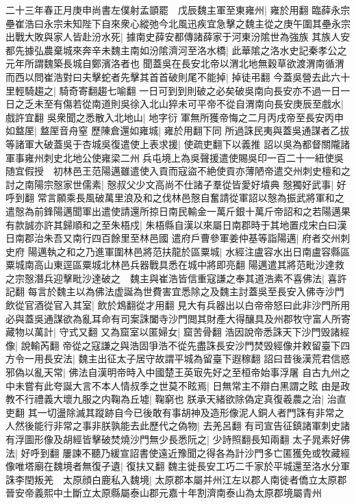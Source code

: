 二十三年春正月庚申尚書左僕射孟顗罷　戊辰魏主軍至東雍州|{
	雍於用翻}
臨薛永宗壘崔浩曰永宗未知陛下自來衆心縱弛今北風迅疾宜急擊之魏主從之庚午圍其壘永宗出戰大敗與家人皆赴汾水死|{
	據南史薛安都傳諸薛家于河東汾隂世為強族}
其族人安都先據弘農棄城來奔辛未魏主南如汾隂濟河至洛水橋|{
	此華隂之洛水史記秦孝公之元年所謂魏築長城自鄭濱洛者也}
聞蓋吳在長安北帝以渭北地無穀草欲渡渭南循渭而西以問崔浩對曰夫擊蛇者先擊其首首破則尾不能掉|{
	掉徒弔翻}
今蓋吳營去此六十里輕騎趨之|{
	騎奇寄翻趨七喻翻}
一日可到到則破之必矣破吳南向長安亦不過一日一日之乏未至有傷若從南道則吳徐入北山猝未可平帝不從自渭南向長安庚辰至戲水|{
	戲許宜翻}
吳衆聞之悉散入北地山|{
	地字衍}
軍無所獲帝悔之二月丙戌帝至長安丙申如盩厔|{
	盩厔音舟窒}
歷陳倉還如雍城|{
	雍於用翻下同}
所過誅民夷與蓋吳通謀者乙拔等諸軍大破蓋吳于杏城吳復遣使上表求援|{
	使疏吏翻下以義推}
詔以吳為都督關隴諸軍事雍州刺史北地公使雍梁二州兵屯境上為吳聲援遣使賜吳印一百二十一紐使吳随宜假授　初林邑王范陽邁雖遣使入貢而寇盜不絶使貢亦薄陋帝遣交州刺史檀和之討之南陽宗慤家世儒素|{
	慤叔父少文高尚不仕諸子羣從皆愛好墳典}
慤獨好武事|{
	好呼到翻}
常言願乘長風破萬里浪及和之伐林邑慤自奮請從軍詔以慤為振武將軍和之遣慤為前鋒陽邁聞軍出遣使請還所掠日南民輸金一萬斤銀十萬斤帝詔和之若陽邁果有款誠亦許其歸順和之至朱梧戍|{
	朱梧縣自漢以來屬日南郡時于其地置戍宋白曰漢日南郡治朱吾又南行四百餘里至林邑國}
遣府戶曹參軍姜仲基等詣陽邁|{
	府者交州刺史府}
陽邁執之和之乃進軍圍林邑將范扶龍於區粟城|{
	水經注盧容水出日南盧容縣區粟城南高山東逕區粟城北林邑兵器戰具悉在城中將即亮翻}
陽邁遣其將范毗沙達救之宗慤潛兵迎擊毗沙達破之　魏主與崔浩皆信重寇謙之奉其道浩素不喜佛法|{
	喜許記翻}
每言於魏主以為佛法虚誕為世費害宜悉除之及魏主討蓋吳至長安入佛寺沙門飲從官酒從官入其室|{
	飲於鴆翻從才用翻}
見大有兵器出以白帝帝怒曰此非沙門所用必與蓋吳通謀欲為亂耳命有司案誅闔寺沙門閲其財產大得釀具及州郡牧守富人所寄藏物以萬計|{
	守式又翻}
又為窟室以匿婦女|{
	窟苦骨翻}
浩因說帝悉誅天下沙門毁諸經像|{
	說輸芮翻}
帝從之寇謙之與浩固爭浩不從先盡誅長安沙門焚毁經像并敕留臺下四方令一用長安法|{
	魏主出征太子居守故謂平城為留臺下遐稼翻}
詔曰昔後漢荒君信惑邪偽以亂天常|{
	佛法自漢明帝時入中國楚王英㝡先好之至桓帝始事浮屠}
自古九州之中未嘗有此夸誕大言不本人情叔季之世莫不眩焉|{
	日無常主不辯白黑謂之眩}
由是政教不行禮義大壞九服之内鞠為丘墟|{
	鞠窮也}
朕承天緒欲除偽定真復羲農之治|{
	治直吏翻}
其一切盪除滅其蹤跡自今已後敢有事胡神及造形像泥人銅人者門誅有非常之人然後能行非常之事非朕孰能去此歷代之偽物|{
	去羌呂翻}
有司宣告征鎮諸軍刺史諸有浮圖形像及胡經皆擊破焚燒沙門無少長悉阮之|{
	少詩照翻長知兩翻}
太子晁素好佛法|{
	好呼到翻}
屢諫不聽乃緩宣詔書使遠近豫聞之得各為計沙門多亡匿獲免或牧藏經像唯塔廟在魏境者無復孑遺|{
	復扶又翻}
魏主徙長安工巧二千家於平城還至洛水分軍誅李閏叛羌　太原顔白鹿私入魏境|{
	太原郡本屬并州江左以郡人南徙者僑立太原郡晉安帝義熙中土斷立太原縣屬泰山郡元嘉十年割濟南泰山為太原郡境屬青州}
